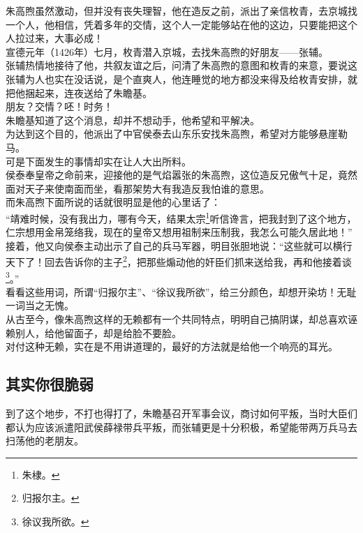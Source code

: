 \begin{multicols}{\theparacolNo}
朱高煦虽然激动，但并没有丧失理智，他在造反之前，派出了亲信枚青，去京城找一个人，他相信，凭着多年的交情，这个人一定能够站在他的这边，只要能把这个人拉过来，大事必成！\\

宣德元年（1426年）七月，枚青潜入京城，去找朱高煦的好朋友——张辅。\\

张辅热情地接待了他，共叙友谊之后，问清了朱高煦的意图和枚青的来意，要说这张辅为人也实在没话说，是个直爽人，他连睡觉的地方都没来得及给枚青安排，就把他捆起来，连夜送给了朱瞻基。\\

朋友？交情？呸！时务！\\

朱瞻基知道了这个消息，却并不想动手，他希望和平解决。\\

为达到这个目的，他派出了中官侯泰去山东乐安找朱高煦，希望对方能够悬崖勒马。\\

可是下面发生的事情却实在让人大出所料。\\

侯泰奉皇帝之命前来，迎接他的是气焰嚣张的朱高煦，这位造反兄傲气十足，竟然面对天子来使南面而坐，看那架势大有我造反我怕谁的意思。\\

而朱高煦下面所说的话就很明显是他的心里话了：\\

“靖难时候，没有我出力，哪有今天，结果太宗\footnote{朱棣。}听信谗言，把我封到了这个地方，仁宗想用金帛笼络我，现在的皇帝又想用祖制来压制我，我怎么可能久居此地！”\\

接着，他又向侯泰主动出示了自己的兵马军器，明目张胆地说：“这些就可以横行天下了！回去告诉你的主子\footnote{归报尔主。}，把那些煽动他的奸臣们抓来送给我，再和他接着谈\footnote{徐议我所欲。}。”\\

看看这些用词，所谓“归报尔主”、“徐议我所欲”，给三分颜色，却想开染坊！无耻一词当之无愧。\\

从古至今，像朱高煦这样的无赖都有一个共同特点，明明自己搞阴谋，却总喜欢诬赖别人，给他留面子，却是给脸不要脸。\\

对付这种无赖，实在是不用讲道理的，最好的方法就是给他一个响亮的耳光。\\

\subsection{其实你很脆弱}
到了这个地步，不打也得打了，朱瞻基召开军事会议，商讨如何平叛，当时大臣们都认为应该派遣阳武侯薛禄带兵平叛，而张辅更是十分积极，希望能带两万兵马去扫荡他的老朋友。\\


\end{multicols}
